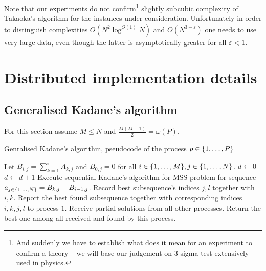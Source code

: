 Note that our experiments do not confirm\footnote{And suddenly we have to establish what does it mean for an experiment to confirm a theory -- we will base our judgement on $3$-sigma test extensively used in physics.} slightly subcubic complexity of Takaoka's algorithm for the instances under consideration.
Unfortunately in order to distinguish complexities $O(N^2 \log^{O(1)}{N})$ and $O(N^{3 - \varepsilon})$ one needs to use very large data, even though the latter is asymptotically greater for all $\varepsilon < 1$.

\section*{Distributed implementation details}

\subsection*{Generalised Kadane's algorithm}

For this section assume $M \leq N$ and $\frac{M (M - 1)}{2} = \omega(P)$.

\begin{algorithm}[h!]
    \caption{Genralised Kadane's algorithm, pseudocode of the process $p \in \{ 1, \dots, P \}$}
    \begin{algorithmic}[1]
        \State Let $B_{i, j} = \sum_{k = 1}^{i}{A_{k, j}}$ and $B_{0, j} = 0$ for all $i \in \{ 1, \dots, M \}, j \in \{ 1, \dots, N \}$. \label{alg1-column-prefixes}
        \State $d \gets 0$
                \State $d \gets d + 1$
                    \State Execute sequential Kadane's algorithm for MSS problem for sequence $a_{j \in \{ 1, \dots, N \}} = B_{k, j} - B_{i-1, j}$.
                    \State Record best subsequence's indices $j, l$ together with $i, k$.
                \EndIf
            \EndFor
        \EndFor
            \State Report the best found subsequence together with corresponding indices $i, k, j, l$ to process $1$.
        \Else
            \State Receive partial solutions from all other processes.
            \State Return the best one among all received and found by this process.
        \EndIf
    \end{algorithmic}
\end{algorithm}

